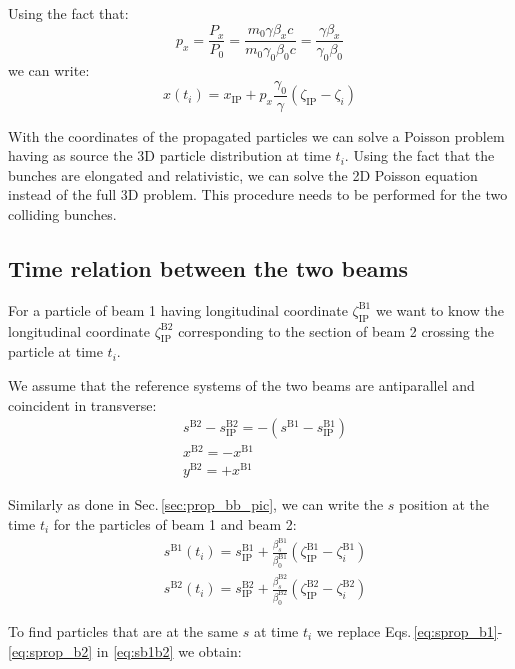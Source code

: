 Using the fact that:
\begin{equation}
p_x=\frac{P_x}{P_0}=\frac{m_0 \gamma \beta_x c}{m_0 \gamma_0 \beta_0 c} =\frac{ \gamma \beta_x}{ \gamma_0 \beta_0} 
\end{equation}
we can write:
\begin{equation}
x \left( t_i \right)
= x_\text{IP} + p_x\frac{\gamma_0}{\gamma}\left(\zeta_\text{IP} -  \zeta_i \right)
\end{equation}

With the coordinates of the propagated particles we can solve a Poisson problem having as source the 3D particle distribution at time $t_i$. Using the fact that the bunches are elongated and relativistic, we can solve the 2D Poisson equation instead of the full 3D problem. This procedure needs to be performed for the two colliding bunches.

\subsection{Time relation between the two beams}
For a particle of beam 1 having longitudinal coordinate $\zeta_\text{IP}^\text{B1}$ we want to know the longitudinal coordinate $\zeta_\text{IP}^\text{B2}$ corresponding to the section of beam 2 crossing the particle at time $t_i$.

We assume that the reference systems of the two beams are antiparallel and coincident in transverse:
\begin{align}
&s^\text{B2} - s_\text{IP}^\text{B2} = 
- \left( s^\text{B1} - s_\text{IP}^\text{B1}\right)
\label{eq:sb1b2}\\
&x^\text{B2} = - x^\text{B1}\\
&y^\text{B2} = + x^\text{B1}
\end{align}

Similarly as done in Sec.\,\ref{sec:prop_bb_pic}, we can write the $s$ position at the time $t_i$ for the particles of beam 1 and beam 2:
\begin{align}
&s^\text{B1} \left( t_i \right)
= s^\text{B1}_\text{IP} + \frac{\beta^\text{B1}_s}{\beta_0^\text{B1}}\left(\zeta^\text{B1}_\text{IP} -  \zeta^\text{B1}_i \right)
\label{eq:sprop_b1}\\
&s^\text{B2} \left( t_i \right)
= s^\text{B2}_\text{IP} + \frac{\beta^\text{B2}_s}{\beta_0^\text{B2}}\left(\zeta^\text{B2}_\text{IP} -  \zeta^\text{B2}_i \right)
\label{eq:sprop_b2}
\end{align}

To find particles that are at the same $s$ at time $t_i$ we replace Eqs.\,\ref{eq:sprop_b1}-\ref{eq:sprop_b2} in \ref{eq:sb1b2} we obtain:

